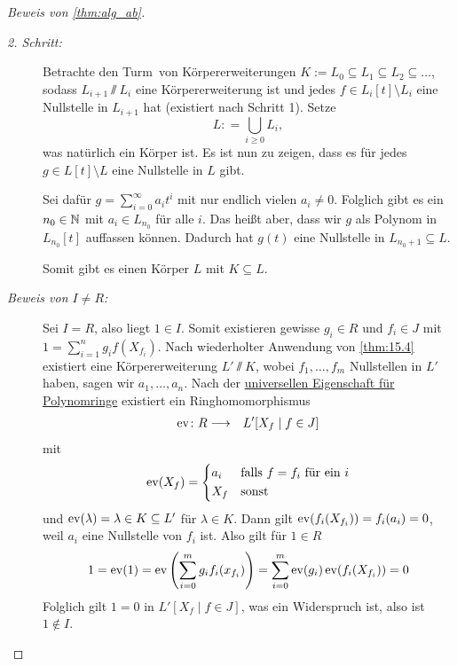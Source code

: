 \documentclass[12pt,a4paper]{scrartcl}
\begin{document}
\begin{proof}[Beweis von \cref{thm:alg_ab}]
\begin{description}
		\item[\emph{2. Schritt:}] Betrachte den \glqq Turm\grqq\ von Körpererweiterungen $K := L_0\subseteq L_1\subseteq L_2\subseteq\dots$, sodass $L_{i+1}\sslash L_{i}$ eine Körpererweiterung ist und jedes $f\in L_i[t]\setminus L_i$ eine Nullstelle in $L_{i+1}$ hat (existiert nach Schritt 1). Setze
		\[L : = \bigcup\limits_{i\geq 0} L_i, \]
		was natürlich ein Körper ist. Es ist nun zu zeigen, dass es für jedes $g\in L[t]\setminus L$ eine Nullstelle in $L$ gibt.
		
		Sei dafür $g = \sum_{i = 0}^{\infty}a_it^i$ mit nur endlich vielen $a_i\neq 0$. Folglich gibt es ein $n_0\in\mathbb N$ mit $a_i\in L_{n_0}$ für alle $i$. Das heißt aber, dass wir $g$ als Polynom in $L_{n_0}[t]$ auffassen können. Dadurch hat $g(t)$ eine Nullstelle in $L_{n_0+1}\subseteq L$.
		
		Somit gibt es einen Körper $L$ mit $K\subseteq L$.
		\item[\emph{Beweis von $I\neq R$:}] Sei $I = R$, also liegt $1\in I$. Somit existieren gewisse $g_i\in R$ und $f_i\in J$ mit $1 = \sum_{i =1}^{n}g_if(X_{f_i})$. Nach wiederholter Anwendung von \cref{thm:15.4} existiert eine Körpererweiterung $L'\sslash K$, wobei $f_1,\dots, f_m$ Nullstellen in $L'$ haben, sagen wir $a_1,\dots, a_n$. Nach der \hyperref[thm:unieig_polyring]{universellen Eigenschaft für Polynomringe} existiert ein Ringhomomorphismus
		\begin{eqnarray*}
			\operatorname{ev}\colon R & \longrightarrow & L'[X_f\mid f\in J]
		\end{eqnarray*}
		mit \[\ev(X_f) = \begin{cases*} a_i & falls $f=f_i$ für ein $i$\\
		X_f & sonst
		\end{cases*}\]							
		und $\operatorname{ev}(\lambda)  = \lambda\in K\subseteq L'$ für $\lambda\in K$. Dann gilt $\operatorname{ev}(f_i(X_{f_i})) = f_i(a_i) = 0$, weil $a_i$ eine Nullstelle von $f_i$ ist. Also gilt für $1\in R$ 
		\[1 = \operatorname{ev}(1) = \operatorname{ev}\left(\sum_{i = 0}^{m}g_if_i(x_{f_i})\right) = \sum_{i = 0}^m\operatorname{ev}(g_i)\operatorname{ev}(f_i(X_{f_i})) = 0\]
		Folglich gilt $1 = 0$ in $L'[X_f\mid f\in J]$, was ein Widerspruch ist, also ist $1\notin I$.
	\end{description}
\end{proof}
	
\end{document}
